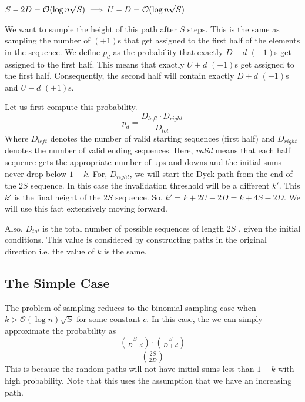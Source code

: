 \begin{lemma}
$S-2D = \Bo(\log n\sqrt S) \implies U-D = \Bo(\log n\sqrt S)$
\label{lem:dyck_var0}
\end{lemma}

We want to sample the height of this path after $S$ steps.
This is the same as sampling the number of $(+1)$s that get assigned to the first half of the elements in the sequence.
We define $p_d$ as the probability that exactly $D-d$ $(-1)$s get assigned to the first half.
This means that exactly $U+d$ $(+1)$s get assigned to the first half.
Consequently, the second half will contain exactly $D+d$ $(-1)$s and $U-d$ $(+1)$s.

Let us first compute this probability.
$$
p_d = \frac{D_{left}\cdot D_{right}}{D_{tot}}
$$
Where $D_{left}$ denotes the number of valid starting sequences (first half)
and $D_{right}$ denotes the number of valid ending sequences.
Here, \textit{valid} means that each half sequence gets the appropriate number of ups and downs
and the initial sums never drop below $1-k$.
For, $D_{right}$, we will start the Dyck path from the end of the $2S$ sequence.
In this case the invalidation threshold will be a different $k'$.
This $k'$ is the final height of the $2S$ sequence. So, $k'=k+2U-2D = k+4S-2D$. We will use this fact extensively moving forward.

Also, $D_{tot}$ is the total number of possible sequences of length $2S$ , given the initial conditions.
This value is considered by constructing paths in the original direction i.e. the value of $k$ is the same.

\subsection{The Simple Case}
The problem of sampling reduces to the binomial sampling case when $k > \mathcal{O}(\log n)\sqrt S$ for some constant $c$.
In this case, the we can simply approximate the probability as
$$
\frac{{{S}\choose{D-d}}\cdot{{S}\choose{D+d}}}{{{2S}\choose{2D}}}
$$
This is because the random paths will not have initial sums less than $1-k$ with high probability.
Note that this uses the assumption that we have an increasing path.


